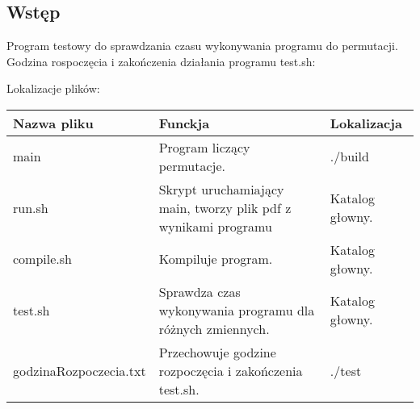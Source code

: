 \documentclass{article}
\begin{document}
\begin{large}

\section{Wstęp}
Program testowy do sprawdzania czasu wykonywania programu do permutacji.
\\Godzina rospoczęcia i zakończenia działania programu test.sh:
\begin{center}
\begin{figure}[hbt!]
\centering
{}
\end{figure}
\end{center}

Lokalizacje plików:

\begin{table}[hbt!]

\begin{tabular}{|l|l|l|} 
\hline
Nazwa pliku & Funckja & Lokalizacja   \\
\hline
main   & Program liczący permutacje.   & ./build  \\
run.sh  & Skrypt uruchamiający main, tworzy plik pdf z wynikami programu & Katalog głowny. \\
compile.sh & Kompiluje program. & Katalog głowny.    \\
test.sh   & Sprawdza czas wykonywania programu dla różnych zmiennych.  & Katalog głowny. \\  
godzinaRozpoczecia.txt  & Przechowuje godzine rozpoczęcia i zakończenia test.sh. & ./test\\
\hline 
\end{tabular}
\end{table}



\end{large}
\end{document}
